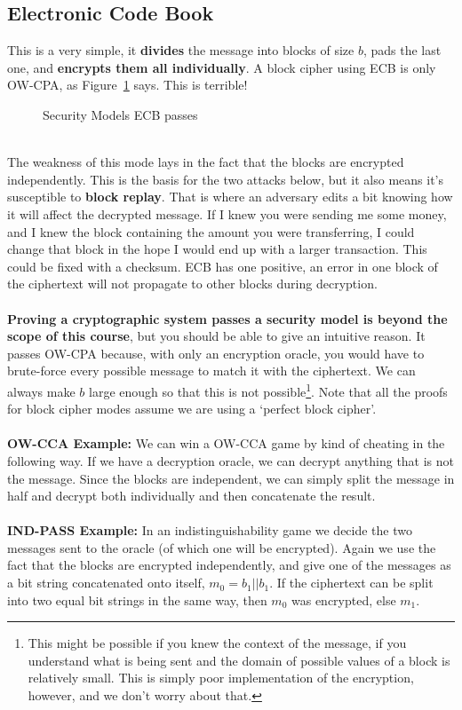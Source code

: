     \subsection{Electronic Code Book}
    This is a very simple, it \textbf{divides} the message into blocks of size $b$, pads the last one, and \textbf{encrypts them all individually}. A block cipher using ECB is only OW-CPA, as Figure~\ref{fig:ecb-attacktable} says. 
    This is terrible!\\
    \begin{figure}[htp!]
    \centering
    \caption{Security Models ECB passes}
    \label{fig:ecb-attacktable}
    \end{figure}
    \\
    The weakness of this mode lays in the fact that the blocks are encrypted independently. This is the basis for the two attacks below, but it also means it's susceptible to \textbf{block replay}. That is where an adversary edits a bit knowing how it will affect the decrypted message. If I knew you were sending me some money, and I knew the block containing the amount you were transferring, I could change that block in the hope I would end up with a larger transaction. This could be fixed with a checksum. ECB has one positive, an error in one block of the ciphertext will not propagate to other blocks during decryption.\\
    \\
    \textbf{Proving a cryptographic system passes a security model is beyond the scope of this course}, but you should be able to give an intuitive reason. It passes OW-CPA because, with only an encryption oracle, you would have to brute-force every possible message to match it with the ciphertext. We can always make $b$ large enough so that this is not possible\footnote{This might be possible if you knew the context of the message, if you understand what is being sent and the domain of possible values of a block is relatively small. This is simply poor implementation of the encryption, however, and we don't worry about that.}. Note that all the proofs for block cipher modes assume we are using a `perfect block cipher'.\\
    \\
    \textbf{OW-CCA Example:} We can win a OW-CCA game by kind of cheating in the following way. If we have a decryption oracle, we can decrypt anything that is not the message. Since the blocks are independent, we can simply split the message in half and decrypt both individually and then concatenate the result.\\
    \\
    \textbf{IND-PASS Example:} In an indistinguishability game we decide the two messages sent to the oracle (of which one will be encrypted). Again we use the fact that the blocks are encrypted independently, and give one of the messages as a bit string concatenated onto itself, $m_0=b_1||b_1$. If the ciphertext can be split into two equal bit strings in the same way, then $m_0$ was encrypted, else $m_1$.
    
